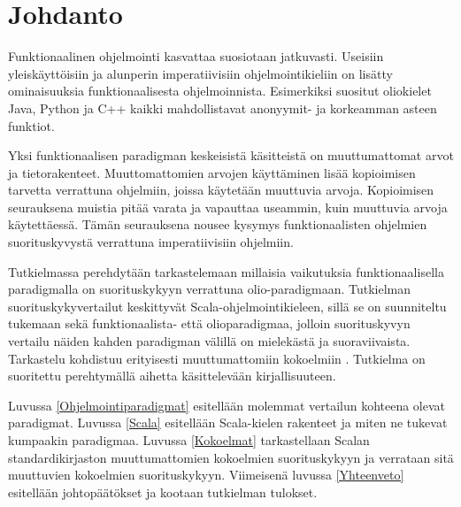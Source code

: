 \chapter{Johdanto} \label{Johdanto}
Funktionaalinen ohjelmointi kasvattaa suosiotaan jatkuvasti. Useisiin yleiskäyttöisiin ja alunperin imperatiivisiin ohjelmointikieliin on lisätty ominaisuuksia funktionaalisesta ohjelmoinnista. Esimerkiksi suositut oliokielet Java, Python ja C++ kaikki mahdollistavat anonyymit- ja korkeamman asteen funktiot. 

Yksi funktionaalisen paradigman keskeisistä käsitteistä on muuttumattomat arvot ja tietorakenteet. Muuttomattomien arvojen käyttäminen lisää kopioimisen tarvetta verrattuna ohjelmiin, joissa käytetään muuttuvia arvoja. Kopioimisen seurauksena muistia pitää varata ja vapauttaa useammin, kuin muuttuvia arvoja käytettäessä. Tämän seurauksena nousee kysymys funktionaalisten ohjelmien suorituskyvystä verrattuna imperatiivisiin ohjelmiin.

Tutkielmassa perehdytään tarkastelemaan millaisia vaikutuksia funktionaalisella paradigmalla on suorituskykyyn verrattuna olio-paradigmaan. Tutkielman suorituskykyvertailut keskittyvät Scala-ohjelmointikieleen, sillä se on suunniteltu tukemaan sekä funktionaalista- että olioparadigmaa, jolloin suorituskyvyn vertailu näiden kahden paradigman välillä on mielekästä ja suoraviivaista. Tarkastelu kohdistuu erityisesti muuttumattomiin kokoelmiin . Tutkielma on suoritettu perehtymällä aihetta käsittelevään kirjallisuuteen.

Luvussa \ref{Ohjelmointiparadigmat} esitellään molemmat vertailun kohteena olevat paradigmat. Luvussa \ref{Scala} esitellään Scala-kielen rakenteet ja miten ne tukevat kumpaakin paradigmaa. Luvussa \ref{Kokoelmat} tarkastellaan Scalan standardikirjaston muuttumattomien kokoelmien suorituskykyyn ja verrataan sitä muuttuvien kokoelmien suorituskykyyn.  Viimeisenä luvussa \ref{Yhteenveto} esitellään johtopäätökset ja kootaan tutkielman tulokset.
